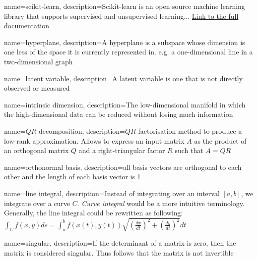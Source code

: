

{
    name=scikit-learn,
    description={Scikit-learn is an open source machine learning library that supports supervised and unsupervised learning... \href{https://scikit-learn.org/stable/getting_started.html}{Link to the full documentation}}
}

{
    name=hyperplane,
    description={A hyperplane is a subspace whose dimension is one less of the space it is currently represented in. e.g. a one-dimensional line in a two-dimensional graph}
}

{
    name=latent variable,
    description={A latent variable is one that is not directly observed or measured \cite{rosipal2005overview}}
}

{
    name=intrinsic dimension,
    description={The low-dimensional manifold in which the high-dimensional data can be reduced without losing much information \cite{GeometricStructureWangCh1}}
}

{
    name=$QR$ decomposition,
    description={$QR$ factorisation method to produce a low-rank approximation. Allows to express an input matrix $A$ as the product of an orthogonal matrix $Q$ and a right-triangular factor $R$ such that $A = QR$ \cite{duersch2017randomized}}
}

{
    name=orthonormal basis,
    description={all basis vectors are orthogonal to each other and the length of each basis vector is 1 \cite{deisenroth2020mathematics}}
}

{
    name=line integral,
    description={Instead of integrating over an interval $[a,b]$, we integrate over a curve $C$.
    \emph{Curve integral} would be a more intuitive terminology. Generally, the line integral could be rewritten as following:\medskip
    \\
    $\int_C f(x,y) ds = \int_a^b f(x(t), y(t)) \sqrt{(\frac{dx}{dt})^2 + (\frac{dy}{dt})^2} dt$
    \quad \cite{stewart2016calculus}}
}

{
    name=singular,
    description={If the determinant of a matrix is zero, then the matrix is considered singular. Thus follows that the matrix is not invertible}
}

